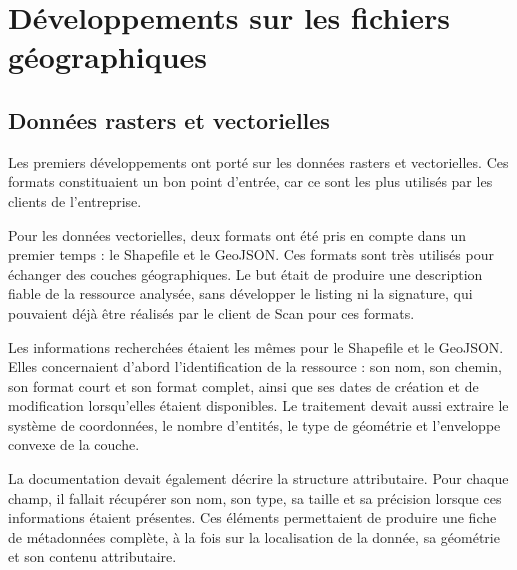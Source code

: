 
\section{Développements sur les fichiers géographiques}
\label{sec:premiers_developpements_fichiers}


\subsection{Données rasters et vectorielles}
\label{subsec:donnees_rasters_vecteurs}

Les premiers développements ont porté sur les données rasters et vectorielles.
Ces formats constituaient un bon point d'entrée, car ce sont les plus utilisés par les clients de l'entreprise.

Pour les données vectorielles, deux formats ont été pris en compte dans un
premier temps : le Shapefile et le GeoJSON. Ces formats sont très utilisés pour
échanger des couches géographiques.
Le but était de produire une description fiable de la ressource analysée, sans
développer le listing ni la signature, qui pouvaient déjà être réalisés par le
client de Scan pour ces formats.

Les informations recherchées étaient les mêmes pour le Shapefile et le GeoJSON.
Elles concernaient d'abord l'identification de la ressource : son nom, son
chemin, son format court et son format complet, ainsi que ses dates de création
et de modification lorsqu'elles étaient disponibles. Le traitement devait aussi
extraire le système de coordonnées, le nombre d'entités, le type de géométrie et
l'enveloppe convexe de la couche.


La documentation devait également décrire la structure attributaire. Pour chaque
champ, il fallait récupérer son nom, son type, sa taille et sa précision lorsque
ces informations étaient présentes. Ces éléments permettaient de produire une
fiche de métadonnées complète, à la fois sur la localisation de la donnée, sa
géométrie et son contenu attributaire.

